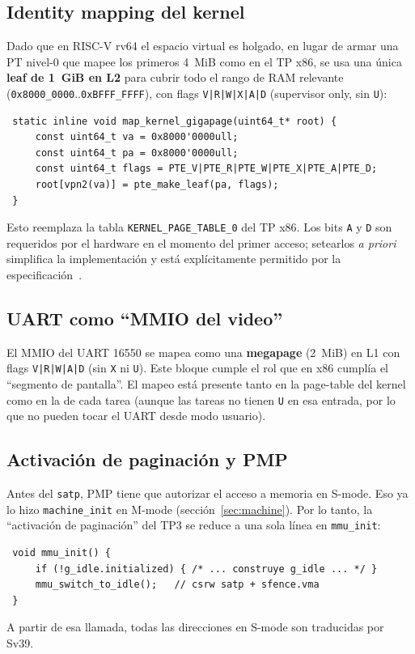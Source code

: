\subsection{Identity mapping del kernel}

Dado que en RISC-V rv64 el espacio virtual es holgado, en lugar de armar una PT nivel-0 que mapee los primeros 4~MiB
como en el TP x86, se usa una única \textbf{leaf de 1~GiB en L2} para cubrir todo el rango de RAM relevante
(\texttt{0x8000\_0000}..\texttt{0xBFFF\_FFFF}), con flags \texttt{V|R|W|X|A|D} (supervisor only, sin \texttt{U}):

\begin{codesnippet}
\begin{verbatim}
 static inline void map_kernel_gigapage(uint64_t* root) {
     const uint64_t va = 0x8000'0000ull;
     const uint64_t pa = 0x8000'0000ull;
     const uint64_t flags = PTE_V|PTE_R|PTE_W|PTE_X|PTE_A|PTE_D;
     root[vpn2(va)] = pte_make_leaf(pa, flags);
 }
\end{verbatim}
\end{codesnippet}

Esto reemplaza la tabla \texttt{KERNEL\_PAGE\_TABLE\_0} del TP x86. Los bits \texttt{A} y \texttt{D} son requeridos por
el hardware en el momento del primer acceso; setearlos \emph{a priori} simplifica la implementación y está
explícitamente permitido por la especificación~\cite{riscv-priv}.

\subsection{UART como ``MMIO del video''}

El MMIO del UART 16550 se mapea como una \textbf{megapage} (2~MiB) en L1 con flags \texttt{V|R|W|A|D} (sin \texttt{X} ni
\texttt{U}). Este bloque cumple el rol que en x86 cumplía el ``segmento de pantalla''. El mapeo está presente tanto en
la page-table del kernel como en la de cada tarea (aunque las tareas no tienen \texttt{U} en esa entrada, por lo que no
pueden tocar el UART desde modo usuario).

\subsection{Activación de paginación y PMP}

Antes del \texttt{satp}, PMP tiene que autorizar el acceso a memoria en S-mode. Eso ya lo hizo \texttt{machine\_init} en
M-mode (sección~\ref{sec:machine}). Por lo tanto, la ``activación de paginación'' del TP3 se reduce a una sola línea en
\texttt{mmu\_init}:

\begin{codesnippet}
\begin{verbatim}
 void mmu_init() {
     if (!g_idle.initialized) { /* ... construye g_idle ... */ }
     mmu_switch_to_idle();   // csrw satp + sfence.vma
 }
\end{verbatim}
\end{codesnippet}

A partir de esa llamada, todas las direcciones en S-mode son traducidas por Sv39.
